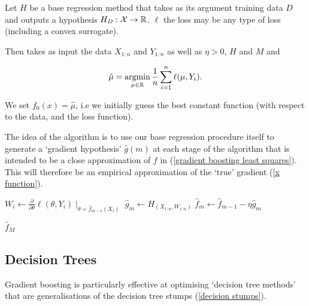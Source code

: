 \documentclass[11pt]{scrartcl}
\begin{document}
\begin{definition}
Let $H$ be a base regression method that takes as its argument training data $D$ and outputs a hypothesis $H_D : \mathcal{X} \rightarrow \mathbb R$. $\ell$ the loss may be any type of loss (including a convex surrogate).

Then  takes as input the data $X_{1:n}$ and $Y_{1:n}$ as well as $\eta > 0$, $H$ and $M$ and

\begin{equation}
    \hat{\mu} = \operatorname*{arg min}_{\mu \in \mathbb R} \frac1n \sum_{i=1}^n \ell(\mu, Y_i).
\end{equation}

We set $f_0(x) = \hat{\mu}$, i.e we initially guess the best constant function (with respect to the data, and the loss function).

The idea of the algorithm is to use our base regression procedure itself to generate a `gradient hypothesis' $\hat{g}(m)$ at each stage of the algorithm that is intended to be a close approximation of $f$ in (\ref{gradient boosting least squares}). This will therefore be an empirical approximation of the `true' gradient (\ref{x function}).

\begin{algorithmic}
    \State $W_i \gets \frac{\partial}{\partial \theta} \ell (\theta, Y_i) \mid_{\theta = \hat{f}_{m-1}(X_i)}$ 
    \State $\hat{g}_m \gets H_{(X_{1:n}, W_{1:n})}$ 
    \State $\hat{f}_m \gets \hat{f}_{m-1} - \eta \hat{g}_m$
\EndFor

\Return $\hat{f}_M$  %
\label{gradient boosting}

\end{algorithmic}
\end{definition}

\subsection{Decision Trees}

Gradient boosting is particularly effective at optimising `decision tree methods' that are generalisations of the decision tree stumps (\ref{decision stumps}).
\end{document}
